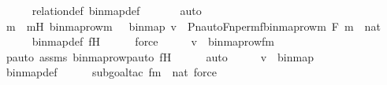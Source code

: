 \begin{isabellebody}
\ \ \ \ \isamarkupfalse%
\ relation{\isacharunderscore}{\kern0pt}def\ binmap{\isacharprime}{\kern0pt}{\isacharunderscore}{\kern0pt}def\ \isanewline
\ \ \ \ \isamarkupfalse%
\ auto\isanewline
\ \ \isamarkupfalse%
\ \isamarkupfalse%
\ m\ \ mH{\isacharcolon}{\kern0pt}\ {\isachardoublequoteopen}{\isacharless}{\kern0pt}binmap{\isacharunderscore}{\kern0pt}row{\isacharprime}{\kern0pt}{\isacharparenleft}{\kern0pt}m{\isacharparenright}{\kern0pt}{\isacharcomma}{\kern0pt}\ {}{\isachargreater}{\kern0pt}\ {\isasymin}\ binmap{\isacharprime}{\kern0pt}{\isachardoublequoteclose}\ {\isachardoublequoteopen}v\ {\isacharequal}{\kern0pt}\ {\isacharless}{\kern0pt}Pn{\isacharunderscore}{\kern0pt}auto{\isacharparenleft}{\kern0pt}Fn{\isacharunderscore}{\kern0pt}perm{\isacharprime}{\kern0pt}{\isacharparenleft}{\kern0pt}f{\isacharparenright}{\kern0pt}{\isacharparenright}{\kern0pt}{\isacharbackquote}{\kern0pt}binmap{\isacharunderscore}{\kern0pt}row{\isacharprime}{\kern0pt}{\isacharparenleft}{\kern0pt}m{\isacharparenright}{\kern0pt}{\isacharcomma}{\kern0pt}\ F{\isacharbackquote}{\kern0pt}{}{\isachargreater}{\kern0pt}{\isachardoublequoteclose}\ {\isachardoublequoteopen}m\ {\isasymin}\ nat{\isachardoublequoteclose}\ \isanewline
\ \ \ \ \isamarkupfalse%
\ binmap{\isacharprime}{\kern0pt}{\isacharunderscore}{\kern0pt}def\ fH\isanewline
\ \ \ \ \isamarkupfalse%
\ force\isanewline
\ \ \isamarkupfalse%
\ \isamarkupfalse%
\ {\isachardoublequoteopen}v\ {\isacharequal}{\kern0pt}\ {\isacharless}{\kern0pt}binmap{\isacharunderscore}{\kern0pt}row{\isacharprime}{\kern0pt}{\isacharparenleft}{\kern0pt}f{\isacharbackquote}{\kern0pt}m{\isacharparenright}{\kern0pt}{\isacharcomma}{\kern0pt}\ {}{\isachargreater}{\kern0pt}{\isachardoublequoteclose}\isanewline
\ \ \ \ \isamarkupfalse%
\ pauto{\isacharunderscore}{\kern0pt}{}\ assms\ binmap{\isacharunderscore}{\kern0pt}row{\isacharprime}{\kern0pt}{\isacharunderscore}{\kern0pt}pauto\ fH\isanewline
\ \ \ \ \isamarkupfalse%
\ auto\isanewline
\ \ \isamarkupfalse%
\ \isamarkupfalse%
\ {\isachardoublequoteopen}v\ {\isasymin}\ binmap{\isacharprime}{\kern0pt}{\isachardoublequoteclose}\ \isanewline
\ \ \ \ \isamarkupfalse%
\ binmap{\isacharprime}{\kern0pt}{\isacharunderscore}{\kern0pt}def\ \isanewline
\ \ \ \ \isamarkupfalse%
{\isacharparenleft}{\kern0pt}subgoal{\isacharunderscore}{\kern0pt}tac\ {\isachardoublequoteopen}f{\isacharbackquote}{\kern0pt}m\ {\isasymin}\ nat{\isachardoublequoteclose}{\isacharcomma}{\kern0pt}\ force{\isacharparenright}{\kern0pt}\isanewline

\end{isabellebody}
